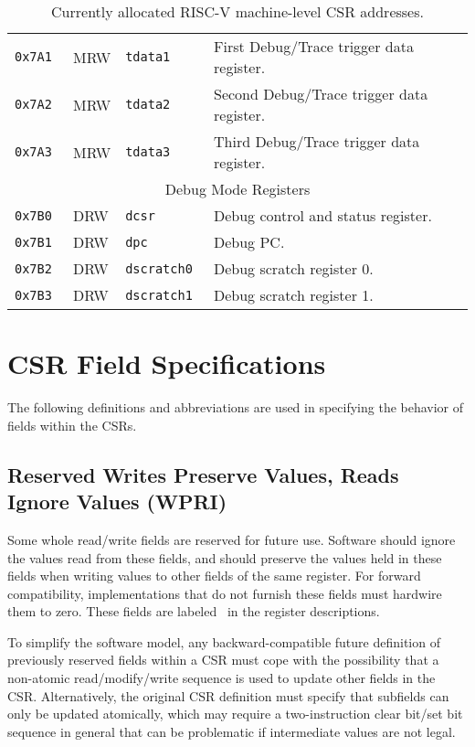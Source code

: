 \begin{table}[htb!]
\begin{center}
\begin{tabular}{|l|l|l|l|}
\tt 0x7A1 & MRW &\tt tdata1 & First Debug/Trace trigger data register. \\
\tt 0x7A2 & MRW &\tt tdata2 & Second Debug/Trace trigger data register. \\
\tt 0x7A3 & MRW &\tt tdata3 & Third Debug/Trace trigger data register. \\
\hline
\multicolumn{4}{|c|}{Debug Mode Registers } \\
\hline
\tt 0x7B0 & DRW &\tt dcsr & Debug control and status register. \\
\tt 0x7B1 & DRW &\tt dpc & Debug PC. \\
\tt 0x7B2 & DRW &\tt dscratch0 & Debug scratch register 0. \\
\tt 0x7B3 & DRW &\tt dscratch1 & Debug scratch register 1. \\
\hline
\end{tabular}
\end{center}
\caption{Currently allocated RISC-V machine-level CSR addresses.}
\label{mcsrnames1}
\end{table}

\clearpage

\section{CSR Field Specifications}


The following definitions and abbreviations are used in specifying the
behavior of fields within the CSRs.

\subsection*{Reserved Writes Preserve Values, Reads Ignore Values (WPRI)}

Some whole read/write fields are reserved for future use.  Software
should ignore the values read from these fields, and should preserve
the values held in these fields when writing values to other fields of
the same register.
For forward compatibility, implementations that do not furnish these fields
must hardwire them to zero.
These fields are labeled \wpri\ in the register descriptions.

\begin{commentary}
To simplify the software model, any backward-compatible future
definition of previously reserved fields within a CSR must cope with
the possibility that a non-atomic read/modify/write sequence is used
to update other fields in the CSR.  Alternatively, the original CSR
definition must specify that subfields can only be updated atomically,
which may require a two-instruction clear bit/set bit sequence in
general that can be problematic if intermediate values are not legal.
\end{commentary}

